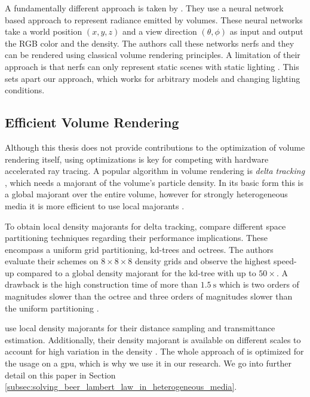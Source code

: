 A fundamentally different approach is taken by \citeauthor{mildenhall_nerf} \cite{mildenhall_nerf}.
They use a neural network based approach to represent radiance emitted by volumes.
These neural networks take a world position $(x, y, z)$ and a view direction $(\theta, \phi)$ as input and output the RGB color and the density.
The authors call these networks \acp{nerf} and they can be rendered using classical volume rendering principles.
A limitation of their approach is that \acsp{nerf} can only represent static scenes with static lighting \cite{mildenhall_nerf}.
This sets apart our approach, which works for arbitrary models and changing lighting conditions.

\subsection{Efficient Volume Rendering}
Although this thesis does not provide contributions to the optimization of volume rendering itself, using optimizations is key for competing with hardware accelerated ray tracing.
A popular algorithm in volume rendering is \textit{delta tracking} \cite{woodcock}, which needs a majorant of the volume's particle density.
In its basic form this is a global majorant over the entire volume, however for strongly heterogeneous media it is more efficient to use local majorants \cite{novak_overview}.

To obtain local density majorants for delta tracking, \citeauthor{yue_space_partitioning} compare different space partitioning techniques regarding their performance implications.
These encompass a uniform grid partitioning, kd-trees and octrees.
The authors evaluate their schemes on $8 \times 8 \times 8$ density grids and observe the highest speed-up compared to a global density majorant for the kd-tree with up to ${50\times}$.
A drawback is the high construction time of more than $\SI{1.5}{\s}$ which is two orders of magnitudes slower than the octree and three orders of magnitudes slower than the uniform partitioning \cite{yue_space_partitioning}.

\citeauthor{brick_grid} use local density majorants for their distance sampling and transmittance estimation.
Additionally, their density majorant is available on different scales to account for high variation in the density \cite{brick_grid}.
The whole approach of \citeauthor{brick_grid} is optimized for the usage on a \ac{gpu}, which is why we use it in our research.
We go into further detail on this paper in Section \ref{subsec:solving_beer_lambert_law_in_heterogeneous_media}.

